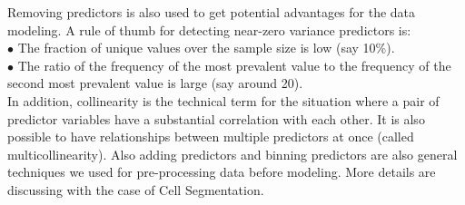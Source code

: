 \documentclass{article}%
\begin{document}
\indent Removing predictors is also used to get potential advantages for the data modeling. A rule of thumb for detecting near-zero variance predictors is:\\
\indent $\bullet$ The fraction of unique values over the sample size is low (say 10\%).\\
\indent $\bullet$ The ratio of the frequency of the most prevalent value to the frequency of the second most prevalent value is large (say around 20).\\
\indent In addition, collinearity is the technical term for the situation where a pair of predictor variables have a substantial correlation with each other. It is also
possible to have relationships between multiple predictors at once (called multicollinearity).
\indent Also adding predictors and binning predictors are also general techniques we used for pre-processing data before modeling. More details are discussing with the case of Cell Segmentation.
\end{document}

